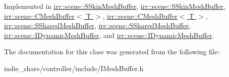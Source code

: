 Implemented in \hyperlink{structirr_1_1scene_1_1SSkinMeshBuffer_ab4d3b6c78a4a3cfe368af4c89350497f}{irr\+::scene\+::\+S\+Skin\+Mesh\+Buffer}, \hyperlink{structirr_1_1scene_1_1SSkinMeshBuffer_ab4d3b6c78a4a3cfe368af4c89350497f}{irr\+::scene\+::\+S\+Skin\+Mesh\+Buffer}, \hyperlink{classirr_1_1scene_1_1CMeshBuffer_ab5a21d48a5af73f1ef880a48c3798a67}{irr\+::scene\+::\+C\+Mesh\+Buffer$<$ T $>$}, \hyperlink{classirr_1_1scene_1_1CMeshBuffer_ab5a21d48a5af73f1ef880a48c3798a67}{irr\+::scene\+::\+C\+Mesh\+Buffer$<$ T $>$}, \hyperlink{structirr_1_1scene_1_1SSharedMeshBuffer_a54e11fd284245c3f5e5e07145ad4a202}{irr\+::scene\+::\+S\+Shared\+Mesh\+Buffer}, \hyperlink{structirr_1_1scene_1_1SSharedMeshBuffer_a54e11fd284245c3f5e5e07145ad4a202}{irr\+::scene\+::\+S\+Shared\+Mesh\+Buffer}, \hyperlink{classirr_1_1scene_1_1IDynamicMeshBuffer_adbe127e3774de6ae7ce96cb534a336e5}{irr\+::scene\+::\+I\+Dynamic\+Mesh\+Buffer}, and \hyperlink{classirr_1_1scene_1_1IDynamicMeshBuffer_adbe127e3774de6ae7ce96cb534a336e5}{irr\+::scene\+::\+I\+Dynamic\+Mesh\+Buffer}.



The documentation for this class was generated from the following file\+:\begin{DoxyCompactItemize}
\item 
indie\+\_\+share/controller/include/I\+Mesh\+Buffer.\+h\end{DoxyCompactItemize}
